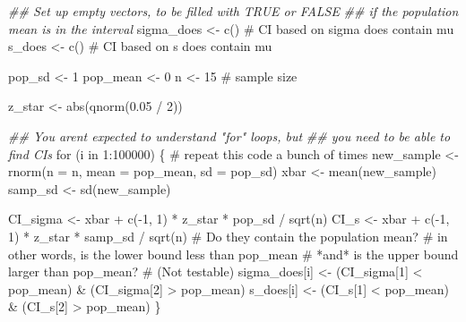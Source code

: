 \documentclass[
  letterpaper,
  DIV=11,
  numbers=noendperiod]{scrreprt}
\newenvironment{Shaded}{\begin{snugshade}}{\end{snugshade}}
\newcommand{\AttributeTok}[1]{\textcolor[rgb]{0.40,0.45,0.13}{#1}}
\newcommand{\CommentTok}[1]{\textcolor[rgb]{0.37,0.37,0.37}{#1}}
\newcommand{\ControlFlowTok}[1]{\textcolor[rgb]{0.00,0.23,0.31}{#1}}
\newcommand{\DecValTok}[1]{\textcolor[rgb]{0.68,0.00,0.00}{#1}}
\newcommand{\DocumentationTok}[1]{\textcolor[rgb]{0.37,0.37,0.37}{\textit{#1}}}
\newcommand{\FloatTok}[1]{\textcolor[rgb]{0.68,0.00,0.00}{#1}}
\newcommand{\FunctionTok}[1]{\textcolor[rgb]{0.28,0.35,0.67}{#1}}
\newcommand{\NormalTok}[1]{\textcolor[rgb]{0.00,0.23,0.31}{#1}}
\newcommand{\OtherTok}[1]{\textcolor[rgb]{0.00,0.23,0.31}{#1}}
\newcommand{\SpecialCharTok}[1]{\textcolor[rgb]{0.37,0.37,0.37}{#1}}
\begin{document}
\begin{Shaded}
\begin{Highlighting}[]
\DocumentationTok{\#\# Set up empty vectors, to be filled with TRUE or FALSE}
\DocumentationTok{\#\# if the population mean is in the interval}
\NormalTok{sigma\_does }\OtherTok{\textless{}{-}} \FunctionTok{c}\NormalTok{() }\CommentTok{\# CI based on sigma does contain mu}
\NormalTok{s\_does }\OtherTok{\textless{}{-}} \FunctionTok{c}\NormalTok{() }\CommentTok{\# CI based on s does contain mu}

\NormalTok{pop\_sd }\OtherTok{\textless{}{-}} \DecValTok{1}
\NormalTok{pop\_mean }\OtherTok{\textless{}{-}} \DecValTok{0}
\NormalTok{n }\OtherTok{\textless{}{-}} \DecValTok{15} \CommentTok{\# sample size}

\NormalTok{z\_star }\OtherTok{\textless{}{-}} \FunctionTok{abs}\NormalTok{(}\FunctionTok{qnorm}\NormalTok{(}\FloatTok{0.05} \SpecialCharTok{/} \DecValTok{2}\NormalTok{))}

\DocumentationTok{\#\# You aren\textquotesingle{}t expected to understand "for" loops, but}
\DocumentationTok{\#\# you need to be able to find CIs}
\ControlFlowTok{for}\NormalTok{ (i }\ControlFlowTok{in} \DecValTok{1}\SpecialCharTok{:}\DecValTok{100000}\NormalTok{) \{ }\CommentTok{\# repeat this code a bunch of times}
\NormalTok{    new\_sample }\OtherTok{\textless{}{-}} \FunctionTok{rnorm}\NormalTok{(}\AttributeTok{n =}\NormalTok{ n, }\AttributeTok{mean =}\NormalTok{ pop\_mean, }\AttributeTok{sd =}\NormalTok{ pop\_sd)}
\NormalTok{    xbar }\OtherTok{\textless{}{-}} \FunctionTok{mean}\NormalTok{(new\_sample)}
\NormalTok{    samp\_sd }\OtherTok{\textless{}{-}} \FunctionTok{sd}\NormalTok{(new\_sample)}

\NormalTok{    CI\_sigma }\OtherTok{\textless{}{-}}\NormalTok{ xbar }\SpecialCharTok{+} \FunctionTok{c}\NormalTok{(}\SpecialCharTok{{-}}\DecValTok{1}\NormalTok{, }\DecValTok{1}\NormalTok{) }\SpecialCharTok{*}\NormalTok{ z\_star }\SpecialCharTok{*}\NormalTok{ pop\_sd }\SpecialCharTok{/} \FunctionTok{sqrt}\NormalTok{(n)}
\NormalTok{    CI\_s }\OtherTok{\textless{}{-}}\NormalTok{ xbar }\SpecialCharTok{+} \FunctionTok{c}\NormalTok{(}\SpecialCharTok{{-}}\DecValTok{1}\NormalTok{, }\DecValTok{1}\NormalTok{) }\SpecialCharTok{*}\NormalTok{ z\_star }\SpecialCharTok{*}\NormalTok{ samp\_sd }\SpecialCharTok{/} \FunctionTok{sqrt}\NormalTok{(n)}
    \CommentTok{\# Do they contain the population mean?}
    \CommentTok{\# in other words, is the lower bound less than pop\_mean}
    \CommentTok{\# *and* is the upper bound larger than pop\_mean?}
    \CommentTok{\# (Not testable)}
\NormalTok{    sigma\_does[i] }\OtherTok{\textless{}{-}}\NormalTok{ (CI\_sigma[}\DecValTok{1}\NormalTok{] }\SpecialCharTok{\textless{}}\NormalTok{ pop\_mean) }\SpecialCharTok{\&}\NormalTok{ (CI\_sigma[}\DecValTok{2}\NormalTok{] }\SpecialCharTok{\textgreater{}}\NormalTok{ pop\_mean)}
\NormalTok{    s\_does[i] }\OtherTok{\textless{}{-}}\NormalTok{ (CI\_s[}\DecValTok{1}\NormalTok{] }\SpecialCharTok{\textless{}}\NormalTok{ pop\_mean) }\SpecialCharTok{\&}\NormalTok{ (CI\_s[}\DecValTok{2}\NormalTok{] }\SpecialCharTok{\textgreater{}}\NormalTok{ pop\_mean)}
\NormalTok{\}}


\end{Highlighting}
\end{Shaded}
\end{document}
